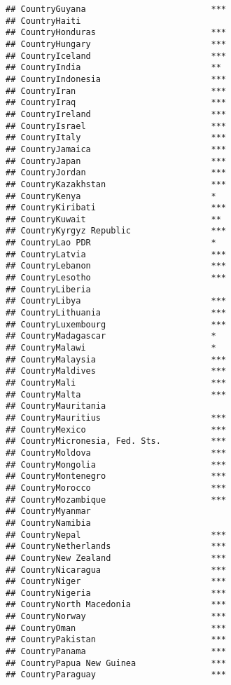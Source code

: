 \documentclass[
]{article}
\begin{document}
\begin{verbatim}
## CountryGuyana                         ***
## CountryHaiti                             
## CountryHonduras                       ***
## CountryHungary                        ***
## CountryIceland                        ***
## CountryIndia                          ** 
## CountryIndonesia                      ***
## CountryIran                           ***
## CountryIraq                           ***
## CountryIreland                        ***
## CountryIsrael                         ***
## CountryItaly                          ***
## CountryJamaica                        ***
## CountryJapan                          ***
## CountryJordan                         ***
## CountryKazakhstan                     ***
## CountryKenya                          *  
## CountryKiribati                       ***
## CountryKuwait                         ** 
## CountryKyrgyz Republic                ***
## CountryLao PDR                        *  
## CountryLatvia                         ***
## CountryLebanon                        ***
## CountryLesotho                        ***
## CountryLiberia                           
## CountryLibya                          ***
## CountryLithuania                      ***
## CountryLuxembourg                     ***
## CountryMadagascar                     *  
## CountryMalawi                         *  
## CountryMalaysia                       ***
## CountryMaldives                       ***
## CountryMali                           ***
## CountryMalta                          ***
## CountryMauritania                        
## CountryMauritius                      ***
## CountryMexico                         ***
## CountryMicronesia, Fed. Sts.          ***
## CountryMoldova                        ***
## CountryMongolia                       ***
## CountryMontenegro                     ***
## CountryMorocco                        ***
## CountryMozambique                     ***
## CountryMyanmar                           
## CountryNamibia                           
## CountryNepal                          ***
## CountryNetherlands                    ***
## CountryNew Zealand                    ***
## CountryNicaragua                      ***
## CountryNiger                          ***
## CountryNigeria                        ***
## CountryNorth Macedonia                ***
## CountryNorway                         ***
## CountryOman                           ***
## CountryPakistan                       ***
## CountryPanama                         ***
## CountryPapua New Guinea               ***
## CountryParaguay                       ***

\end{verbatim}
\end{document}

